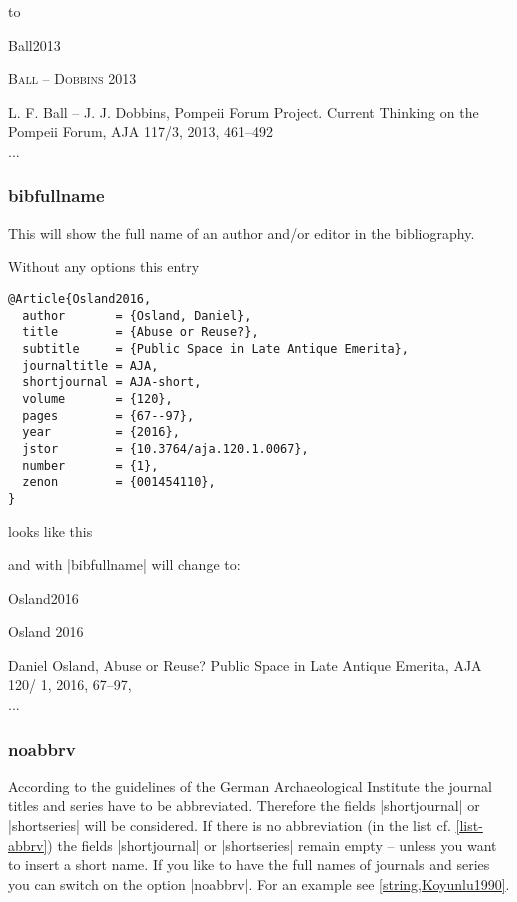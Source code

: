 \documentclass[a4paper,
10pt,
greek,
french,
spanish,
italian,
ngerman,
english
]{ltxdoc}
\begin{document}

to 

\begin{bibbsp}{Ball2013}
\parbox[t]{3cm}{{\scshape {\color{red}Ball – Dobbins}} 2013} \parbox[t]{8cm}{L. F. Ball – J. J. Dobbins, Pompeii Forum Project. Current Thinking on the Pompeii Forum, AJA 117/3, 2013, 461–492\\
...}
\end{bibbsp}


\subsubsection{bibfullname}\label{bibfullname}
This will show the full name of an author and/or editor in the bibliography.

Without any options this entry
\begin{lstlisting}[style=bibentry,label=Osland2016,caption={{@}Article\{Osland2016,…\} }]
@Article{Osland2016,
  author       = {Osland, Daniel},
  title        = {Abuse or Reuse?},
  subtitle     = {Public Space in Late Antique Emerita},
  journaltitle = AJA,
  shortjournal = AJA-short,
  volume       = {120},
  pages        = {67--97},
  year         = {2016},
  jstor        = {10.3764/aja.120.1.0067},
  number       = {1},
  zenon        = {001454110},
}
\end{lstlisting}
looks like this

and with |bibfullname| will change to:

\begin{bibbsp}{Osland2016}
\parbox[t]{1.7cm}{Osland 2016} \parbox[t]{9cm}{{\color{red}Daniel} Osland, Abuse or Reuse? Public Space in Late Antique Emerita, AJA 120/ 1, 2016, 67–97,\\
...}
\end{bibbsp}


\subsubsection{noabbrv}\label{noabbrevs}
According to the guidelines of the German Archaeological Institute the journal titles and series have to be abbreviated.
Therefore the fields |shortjournal| or |shortseries| will be considered. 
If there is no abbreviation (in the list cf. \cref{list-abbrv}) the fields |shortjournal| or |shortseries| remain empty -- unless you want to insert a short name.  
If you like to have the full names of journals and series you can switch on the option |noabbrv|.
For an example see \cref{string,Koyunlu1990}.
\end{document}
